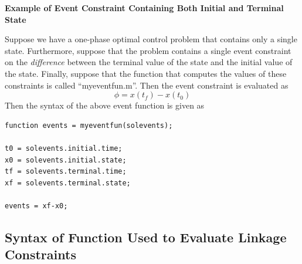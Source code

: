 \documentclass[10pt,final]{report}
\newenvironment{shadedframe}{%
  \def\FrameCommand{\fcolorbox{black}{shadecolor}}%
  \MakeFramed {\FrameRestore}}
{\endMakeFramed}
\begin{document}
\begin{shadedframe}
{\noindent}{\bf Example of Event Constraint Containing Both Initial and Terminal State}
\vspace{12pt}

{\noindent}Suppose we have a one-phase optimal control problem that contains
only a single state.  Furthermore, suppose that the problem contains a single
event constraint on the {\em difference} between the terminal value of the
state and the initial value of the state.  Finally, suppose that the function
that computes the values of these constraints is called ``myeventfun.m''.
Then the event constraint is evaluated as
\begin{displaymath}
  \phi = x(t_f)-x(t_0)
\end{displaymath}
Then the syntax of the above event function is given as
\begin{verbatim}
function events = myeventfun(solevents);

t0 = solevents.initial.time;
x0 = solevents.initial.state;
tf = solevents.terminal.time;
xf = solevents.terminal.state;

events = xf-x0;
\end{verbatim}

\end{shadedframe}

\subsection{Syntax of Function Used to Evaluate Linkage Constraints\label{sect:_Link_syntax}}
\end{document}
